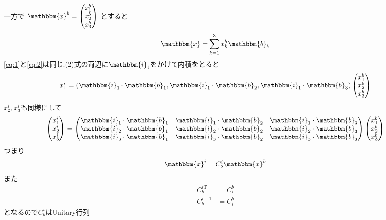 \documentclass[class=article, crop=false, preview=false, dvipdfmx, a4paper]{standalone}
\begin{document}
一方で
$\mathbbm{x}^b=
    \begin{pmatrix}
    	x^b_1\\
        x^b_2\\
        x^b_3\\
    \end{pmatrix}$
とすると
\begin{equation}
\mathbbm{x} = \sum_{k=1}^{3} x^b_k \mathbbm{b}_k  \label{eq:2}
\end{equation}
\eqref{eq:1}と\eqref{eq:2}は同じ.(2)式の両辺に$\mathbbm{i}_1$をかけて内積をとると
\[ x^i_1 =
	\left(
		\mathbbm{i}_1 \cdot \mathbbm{b}_1,
        \mathbbm{i}_1 \cdot \mathbbm{b}_2,
        \mathbbm{i}_1 \cdot \mathbbm{b}_3
    \right)
	\begin{pmatrix}
    	x^b_1\\
        x^b_2\\
        x^b_3\\
    \end{pmatrix}
\]
$x^i_2, x^i_3$も同様にして
\[
\begin{pmatrix}
	x^i_1\\
    x^i_2\\
    x^i_3\\
\end{pmatrix}
=
\begin{pmatrix}
	\mathbbm{i}_1 \cdot \mathbbm{b}_1 & 
    \mathbbm{i}_1 \cdot \mathbbm{b}_2 & 
    \mathbbm{i}_1 \cdot \mathbbm{b}_3 \\
    \mathbbm{i}_2 \cdot \mathbbm{b}_1 &
    \mathbbm{i}_2 \cdot \mathbbm{b}_2 &
    \mathbbm{i}_2 \cdot \mathbbm{b}_3 \\
    \mathbbm{i}_3 \cdot \mathbbm{b}_1 & 
    \mathbbm{i}_3 \cdot \mathbbm{b}_2 & 
    \mathbbm{i}_3 \cdot \mathbbm{b}_3
\end{pmatrix}
\begin{pmatrix}
	x^b_1\\
    x^b_2\\
    x^b_3\\
\end{pmatrix}
\]
つまり
\[ \mathbbm{x}^i = C^i_b\mathbbm{x}^b\]
また
\begin{align}
C_b^{i\mathrm{T}} & = C_i^b \\
C_b^{i-1} & = C^b_i
\end{align}
となるので$C_b^i$はUnitary行列
\end{document}
